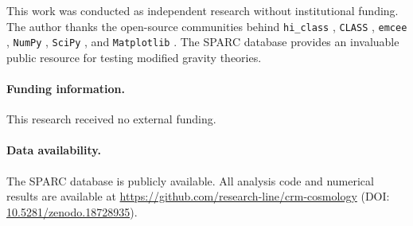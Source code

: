 \documentclass[aps,prd,twocolumn,superscriptaddress,nofootinbib]{revtex4-2}
\begin{document}
\begin{acknowledgments}
This work was conducted as independent research without institutional funding. The author thanks the open-source communities behind \texttt{hi\_class} \cite{Zumalacarregui2017}, \texttt{CLASS} \cite{Blas2011}, \texttt{emcee} \cite{ForemanMackey2013}, \texttt{NumPy} \cite{Harris2020}, \texttt{SciPy} \cite{Virtanen2020}, and \texttt{Matplotlib} \cite{Hunter2007}. The SPARC database \cite{Lelli2016} provides an invaluable public resource for testing modified gravity theories.
\end{acknowledgments}

\paragraph{Funding information.}
This research received no external funding.

\paragraph{Data availability.}
The SPARC database \cite{Lelli2016} is publicly available.
All analysis code and numerical results are available at
\url{https://github.com/research-line/crm-cosmology}
(DOI: \href{https://doi.org/10.5281/zenodo.18728935}{10.5281/zenodo.18728935}).

\end{document}
